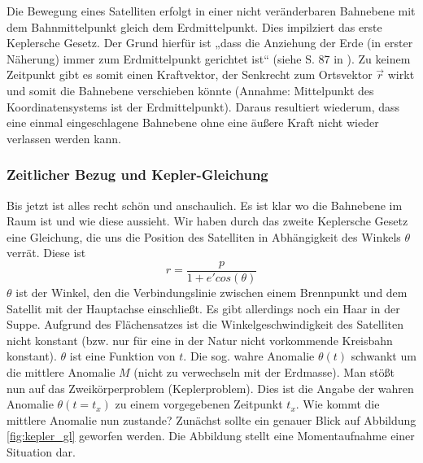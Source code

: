 \newpar
Die Bewegung eines Satelliten erfolgt in einer nicht veränderbaren Bahnebene mit dem Bahnmittelpunkt gleich dem Erdmittelpunkt. Dies impilziert das erste Keplersche Gesetz. Der Grund hierfür ist „dass die Anziehung der Erde (in erster Näherung) immer zum Erdmittelpunkt gerichtet ist“ (siehe S. 87 in \cite{HandRaum}). Zu keinem Zeitpunkt gibt es somit einen Kraftvektor, der Senkrecht zum Ortsvektor \ensuremath{\vec{r}} wirkt und somit die Bahnebene verschieben könnte (Annahme: Mittelpunkt des Koordinatensystems ist der Erdmittelpunkt). Daraus resultiert wiederum, dass eine einmal eingeschlagene Bahnebene ohne eine äußere Kraft nicht wieder verlassen werden kann.
 
\subsubsection{Zeitlicher Bezug und Kepler-Gleichung}
Bis jetzt ist alles recht schön und anschaulich. Es ist klar wo die Bahnebene im Raum ist und wie diese aussieht. Wir haben durch das zweite Keplersche Gesetz eine Gleichung, die uns die Position des Satelliten in Abhängigkeit des Winkels \ensuremath{\theta} verrät. Diese ist 
\begin{equation}
	r = \frac{p}{1 + e' cos(\theta)} 
\end{equation}
\ensuremath{\theta} ist der Winkel, den die Verbindungslinie zwischen einem Brennpunkt und dem Satellit mit der Hauptachse einschließt. Es gibt allerdings noch ein Haar in der Suppe. Aufgrund des Flächensatzes ist die Winkelgeschwindigkeit des Satelliten nicht konstant (bzw. nur für eine in der Natur nicht vorkommende Kreisbahn konstant). \ensuremath{\theta} ist eine Funktion von \ensuremath{t}. Die sog. wahre Anomalie \ensuremath{\theta(t)} schwankt um die mittlere Anomalie \ensuremath{M} (nicht zu verwechseln mit der Erdmasse). Man stößt nun auf das Zweikörperproblem (Keplerproblem). Dies ist die Angabe der wahren Anomalie \ensuremath{\theta(t=t_x)} zu einem vorgegebenen Zeitpunkt \ensuremath{t_x}.  Wie kommt die mittlere Anomalie nun zustande? Zunächst sollte ein genauer Blick auf Abbildung \ref{fig:kepler_gl} geworfen werden. Die Abbildung stellt eine Momentaufnahme einer Situation dar.     
